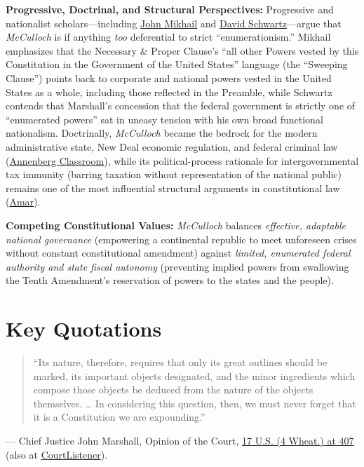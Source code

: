 \documentclass[12pt]{article}
\begin{document}
\textbf{Progressive, Doctrinal, and Structural Perspectives:} Progressive and nationalist scholars---including \href{https://scholarship.law.umn.edu/cgi/viewcontent.cgi?article=2232&context=concomm}{John Mikhail} and \href{https://www.law.georgetown.edu/public-policy-journal/wp-content/uploads/sites/23/2021/09/Schwartz.pdf}{David Schwartz}---argue that \textit{McCulloch} is if anything \textit{too} deferential to strict ``enumerationism.'' Mikhail emphasizes that the Necessary \& Proper Clause's ``all other Powers vested by this Constitution in the Government of the United States'' language (the ``Sweeping Clause'') points back to corporate and national powers vested in the United States as a whole, including those reflected in the Preamble, while Schwartz contends that Marshall's concession that the federal government is strictly one of ``enumerated powers'' sat in uneasy tension with his own broad functional nationalism. Doctrinally, \textit{McCulloch} became the bedrock for the modern administrative state, New Deal economic regulation, and federal criminal law (\href{https://www.annenbergclassroom.org/resource/the-pursuit-of-justice/pursuit-justice-chapter-2-national-bank-federalism/}{Annenberg Classroom}), while its political-process rationale for intergovernmental tax immunity (barring taxation without representation of the national public) remains one of the most influential structural arguments in constitutional law (\href{https://akhilamar.com/wp-content/uploads/2022/04/Intratextualism.pdf}{Amar}).

\textbf{Competing Constitutional Values:} \textit{McCulloch} balances \textit{effective, adaptable national governance} (empowering a continental republic to meet unforeseen crises without constant constitutional amendment) against \textit{limited, enumerated federal authority and state fiscal autonomy} (preventing implied powers from swallowing the Tenth Amendment's reservation of powers to the states and the people).

\section{Key Quotations}

\begin{quote}
``Its nature, therefore, requires that only its great outlines should be marked, its important objects designated, and the minor ingredients which compose those objects be deduced from the nature of the objects themselves. \ldots{} In considering this question, then, we must never forget that it is a Constitution we are expounding.''
\end{quote}
\noindent --- Chief Justice John Marshall, Opinion of the Court, \href{https://supreme.justia.com/cases/federal/us/17/316/}{17 U.S. (4 Wheat.) at 407} (also at \href{https://www.courtlistener.com/opinion/85272/mculloch-v-state-of-maryland/}{CourtListener}).
\end{document}
